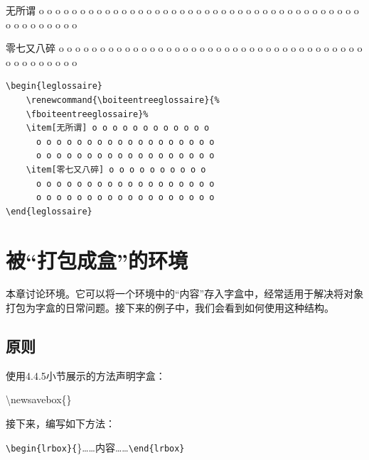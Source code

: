 \begin{codelist}[]{
    \begin{leglossaire}
        \renewcommand{\boiteentreeglossaire}{%
        \fboiteentreeglossaire}%
        \item[无所谓] o o o o o o o o o o o o
          o o o o o o o o o o o o o o o o o o
          o o o o o o o o o o o o o o o o o o
        \item[零七又八碎] o o o o o o o o o o
          o o o o o o o o o o o o o o o o o o
          o o o o o o o o o o o o o o o o o o
    \end{leglossaire}
}\begin{verbatim}
\begin{leglossaire}
    \renewcommand{\boiteentreeglossaire}{%
    \fboiteentreeglossaire}% 
    \item[无所谓] o o o o o o o o o o o o
      o o o o o o o o o o o o o o o o o o
      o o o o o o o o o o o o o o o o o o
    \item[零七又八碎] o o o o o o o o o o
      o o o o o o o o o o o o o o o o o o
      o o o o o o o o o o o o o o o o o o
\end{leglossaire}
\end{verbatim}
\end{codelist}

\section{被“打包成盒”的环境}

本章讨论环境。它可以将一个环境中的“内容”存入字盒中，经常适用于解决将对象打包为字盒的日常问题。接下来的例子中，我们会看到如何使用这种结构。

\subsection{原则}

使用4.4.5小节展示的方法声明字盒：

\begin{dmd}
\backslash newsavebox\{\}
\end{dmd}

接下来，编写如下方法：

\begin{dmd}
\verb|\begin{lrbox}{|\}……内容……\verb|\end{lrbox}|
\end{dmd}

